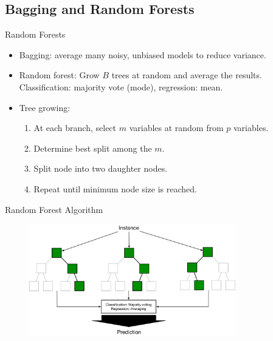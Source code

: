 \documentclass[aspectratio=169]{beamer}
\begin{document}
\subsection{Bagging and Random Forests}

\begin{frame}{Random Forests}
    \begin{itemize}
        \item Bagging: average many noisy, unbiased models to reduce variance.
        \item Random forest: Grow $B$ trees at random and average the results. Classification: majority vote (mode), regression: mean.
        \item Tree growing:
        \begin{enumerate}
            \item At each branch, select $m$ variables at random from $p$ variables.
            \item Determine best split among the $m$.
            \item Split node into two daughter nodes.
            \item Repeat until minimum node size is reached.
        \end{enumerate}
        
    \end{itemize}
\end{frame}


\begin{frame}{Random Forest Algorithm}
\begin{figure}
    \centering
    \includegraphics[width=0.8\textwidth]{figures/randomforestalgo.pdf}
\end{figure}
\end{frame}
\end{document}
